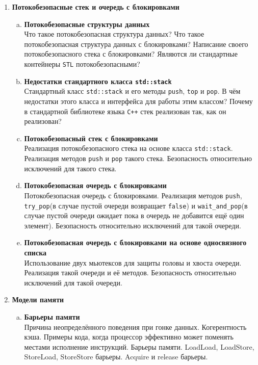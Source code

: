 \documentclass{article}
\begin{document}
\begin{enumerate}
\newpage
\item \textbf{Потокобезопасные стек и очередь с блокировками}
\begin{enumerate}[a.]
\item \textbf{Потокобезопасные структуры данных}\\
Что такое потокобезопасная структура данных? Что такое потокобезопасная структура данных с блокировками? Написание своего потокобезопасного стека с блокировками? Являются ли стандартные контейнеры \texttt{STL} потокобезопасными?

\item \textbf{Недостатки стандартного класса \texttt{std::stack}}\\
Стандартный класс \texttt{std::stack} и его методы \texttt{push}, \texttt{top} и \texttt{pop}. В чём недостатки этого класса и интерфейса для работы этим классом? Почему в стандартной библиотеке языка \texttt{C++} стек реализован так, как он реализован?

\item \textbf{Потокобезопасный стек с блокировками}\\
Реализация потокобезопасного стека на основе класса \texttt{std::stack}. Реализация методов \texttt{push} и \texttt{pop} такого стека. Безопасность относительно исключений для такого стека.

\item \textbf{Потокобезопасная очередь с блокировками}\\
Потокобезопасная очередь с блокировками. Реализация методов \texttt{push}, \texttt{try\_pop}(в случае пустой очереди возвращает \texttt{false}) и \texttt{wait\_and\_pop}(в случае пустой очереди ожидает пока в очередь не добавится ещё один элемент). Безопасность относительно исключений для такой очереди.

\item \textbf{Потокобезопасная очередь с блокировками на основе односвязного списка}\\
Использование двух мьютексов для защиты головы и хвоста очереди. Реализация такой очереди и её методов. Безопасность относительно исключений для такой очереди.
\end{enumerate}



\item \textbf{Модели памяти}
\begin{enumerate}[a.]
\item \textbf{Барьеры памяти}\\
Причина неопределённого поведения при гонке данных. Когерентность кэша. Примеры кода, когда процессор эффективно может поменять местами исполнение инструкций. Барьеры памяти. LoadLoad, LoadStore, StoreLoad, StoreStore барьеры. Acquire и release барьеры. 


\end{enumerate}
\end{enumerate}
\end{document}
